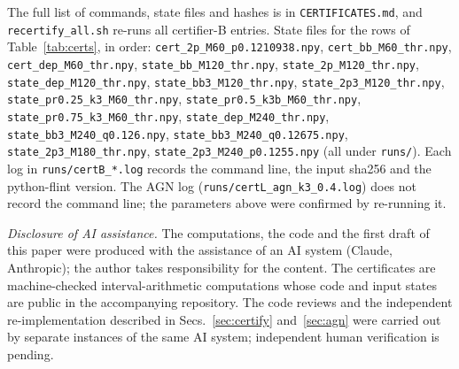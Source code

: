 \documentclass[aps,pra,reprint,superscriptaddress,nofootinbib,longbibliography,floatfix]{revtex4-2}
\theoremstyle{remark}
\begin{document}
{\raggedright The full list of commands, state files and hashes is in \texttt{CERTIFICATES.md}, and
\texttt{recertify\_all.sh} re-runs all certifier-B entries. State files for the rows of
Table~\ref{tab:certs}, in order: \texttt{cert\_2p\_M60\_p0.1210938.npy}, \texttt{cert\_bb\_M60\_thr.npy},
\texttt{cert\_dep\_M60\_thr.npy}, \texttt{state\_bb\_M120\_thr.npy}, \texttt{state\_2p\_M120\_thr.npy},
\texttt{state\_dep\_M120\_thr.npy}, \texttt{state\_bb3\_M120\_thr.npy}, \texttt{state\_2p3\_M120\_thr.npy},
\texttt{state\_pr0.25\_k3\_M60\_thr.npy}, \texttt{state\_pr0.5\_k3b\_M60\_thr.npy},
\texttt{state\_pr0.75\_k3\_M60\_thr.npy}, \texttt{state\_dep\_M240\_thr.npy},
\texttt{state\_bb3\_M240\_q0.126.npy}, \texttt{state\_bb3\_M240\_q0.12675.npy}, \texttt{state\_2p3\_M180\_thr.npy},
\texttt{state\_2p3\_M240\_p0.1255.npy} (all under \texttt{runs/}). Each
log in \texttt{runs/certB\_*.log} records the command line, the input sha256 and the python-flint version.
The AGN log (\texttt{runs/certL\_agn\_k3\_0.4.log}) does not record the command line; the parameters
above were confirmed by re-running it.\par}

\begin{acknowledgments}
\textit{Disclosure of AI assistance.} The computations, the code and the first draft of this paper were
produced with the assistance of an AI system (Claude, Anthropic); the author takes responsibility for the
content. The certificates are machine-checked interval-arithmetic computations whose code and input states
are public in the accompanying repository. The code reviews and the independent re-implementation
described in Secs.~\ref{sec:certify} and~\ref{sec:agn} were carried out by separate instances of the same
AI system; independent human verification is pending.
\end{acknowledgments}


\end{document}
